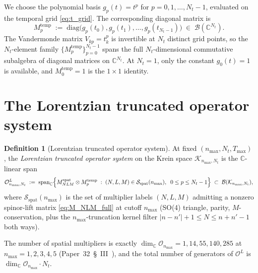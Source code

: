 \documentclass[11pt,a4paper]{article}
\theoremstyle{plain}
\theoremstyle{definition}
\newtheorem{definition}[theorem]{Definition}
\newcommand{\nmax}{n_{\max}}
\newcommand{\Nt}{N_t}
\newcommand{\Krein}{\mathcal{K}}
\newcommand{\Op}{\mathcal{O}}
\newcommand{\Bcal}{\mathcal{B}}
\newcommand{\C}{\mathbb{C}}
\newcommand{\spat}{\mathrm{spat}}
\newcommand{\temp}{\mathrm{temp}}
\begin{document}
We choose the polynomial basis $g_p(t) = t^p$ for
$p = 0, 1, \ldots, \Nt - 1$, evaluated on the temporal grid
\eqref{eq:t_grid}. The corresponding diagonal matrix is
\begin{equation}\label{eq:M_temp}
   M_p^{\temp}
   \;:=\; \mathrm{diag}\bigl(g_p(t_0), g_p(t_1), \ldots,
                             g_p(t_{\Nt - 1})\bigr)
   \;\in\; \Bcal(\C^{\Nt}).
\end{equation}
The Vandermonde matrix
$V_{kp} = t_k^p$ is invertible at $\Nt$ distinct grid points, so the
$\Nt$-element family $\{M_p^{\temp}\}_{p = 0}^{\Nt - 1}$ spans the
full $\Nt$-dimensional commutative subalgebra of diagonal matrices on
$\C^{\Nt}$. At $\Nt = 1$, only the constant $g_0(t) = 1$ is
available, and $M_0^{\temp} = 1$ is the $1 \times 1$ identity.

\section{The Lorentzian truncated operator system}\label{sec:op_system}

\begin{definition}[Lorentzian truncated operator system]
\label{def:O_L}
At fixed $(\nmax, \Nt, T_{\max})$, the \emph{Lorentzian truncated
operator system} on the Krein space $\Krein_{\nmax, \Nt}$ is the
$\C$-linear span
\begin{equation}\label{eq:O_L_def}
   \Op_{\nmax, \Nt}^L
   \;:=\; \mathrm{span}_\C
         \Bigl\{
           M^{\spat}_{NLM} \otimes M^{\temp}_p
           \;:\;
           (N, L, M) \in \mathcal{S}_{\spat}(\nmax),
           \;\; 0 \le p \le \Nt - 1
         \Bigr\}
   \;\subset\; \Bcal(\Krein_{\nmax, \Nt}),
\end{equation}
where $\mathcal{S}_{\spat}(\nmax)$ is the set of multiplier labels
$(N, L, M)$ admitting a nonzero spinor-lift matrix
\eqref{eq:M_NLM_full} at cutoff $\nmax$ (SO(4) triangle, parity,
$M$-conservation, plus the $\nmax$-truncation kernel filter
$|n - n'| + 1 \le N \le n + n' - 1$ both ways).
\end{definition}

The number of spatial multipliers is exactly
$\dim_\C \Op_{\nmax} = 1, 14, 55, 140, 285$ at $\nmax = 1, 2, 3, 4, 5$
(Paper~32~\S~III~\cite{paper32}), and the total number of generators of
$\Op^L$ is $\dim_\C \Op_{\nmax} \cdot \Nt$.
\end{document}
